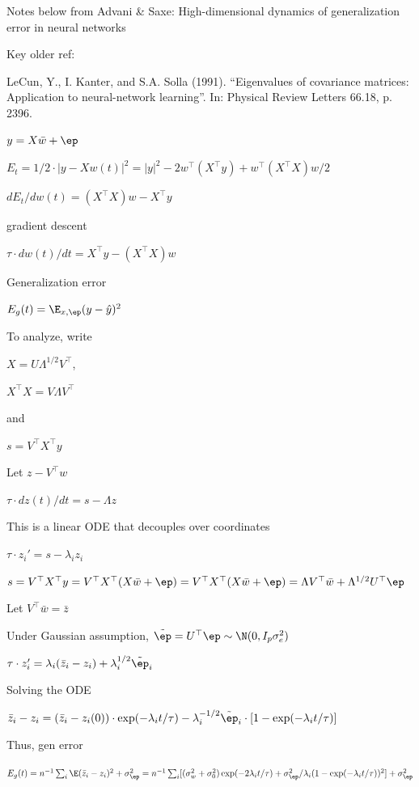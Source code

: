\documentclass[english]{article}
\begin{document}
\benum
\item Notes below from Advani \& Saxe: High-dimensional dynamics of generalization error
in neural networks
\item Key older ref: 

LeCun, Y., I. Kanter, and S.A. Solla (1991). “Eigenvalues of covariance matrices: Application
to neural-network learning”. In: Physical Review Letters 66.18, p. 2396.

\item  $y = X\bar w+\ep$

$E_t = 1/2\cdot |y-Xw(t)|^2 = |y|^2 - 2 w^\top (X^\top y) + w^\top  (X^\top X) w/2$

$dE_t/dw(t) =   (X^\top X) w - X^\top y $

gradient descent 

$\tau \cdot dw(t)/dt  =   X^\top y - (X^\top X) w$

Generalization error 

$E_g(t) = \E_{x,\ep} (y-\hat y)^2$

\item To analyze, write

$X = U\Lambda^{1/2} V^\top$, 

$X^\top X  = V\Lambda V^\top$

and 

$s = V^\top X^\top y$

Let $z - V^\top w$

$\tau \cdot dz(t)/dt  =  s- \Lambda z$

This is a linear ODE that decouples over coordinates

$\tau \cdot z_i'  =  s- \lambda_i z_i$

$s = V^\top X^\top y =  V^\top X^\top (X\bar w+\ep) =  V^\top X^\top (X\bar  w+\ep) =  \Lambda V^\top\bar  w+ \Lambda^{1/2} U^\top \ep$

Let $V^\top \bar w = \bar z$

Under Gaussian assumption, $\tilde \ep = U^\top \ep \sim \N(0,I_p\sigma_e^2)$

$\tau \cdot z_i'  =   \lambda_i (\bar z_i-z_i)+ \lambda_i^{1/2}\tilde \ep_i$

Solving the ODE

$\bar z_i-z_i = (\bar z_i-z_i(0))\cdot \exp(-\lambda_i t/\tau) - \lambda_i^{-1/2}\tilde \ep_i\cdot[1- \exp(-\lambda_i t/\tau)]$

Thus, gen error

$E_g(t) = n^{-1}  \sum_i  \E (\bar z_i-z_i)^2+\sigma_\ep^2 =  
n^{-1}  \sum_i  [(\sigma_w^2+\sigma_0^2)\exp(-2\lambda_i t/\tau)+\sigma_\ep^2/\lambda_i(1- \exp(-\lambda_i t/\tau))^2]+\sigma_\ep^2$
\end{document}
